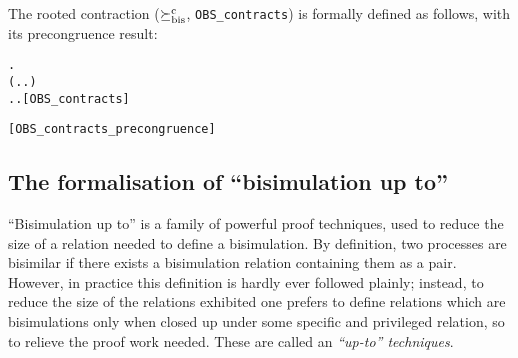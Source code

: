 The rooted contraction ($\mathrel{\succeq^{\rm{c}}_{\rm{bis}}}$, \texttt{OBS_contracts}) is formally
defined as follows, with its precongruence result:
\begin{alltt}
 \HOLSymConst{\HOLTokenObsContracts}  \HOLSymConst{\HOLTokenDefEquality{}}
  \HOLSymConst{\HOLTokenForall{}}.
      (\HOLSymConst{\HOLTokenForall{}}.  \HOLTokenTransBegin{}\HOLTokenTransEnd {} \HOLSymConst{\HOLTokenImp{}} \HOLSymConst{\HOLTokenExists{}}.  \HOLTokenTransBegin{}\HOLTokenTransEnd {} \HOLSymConst{\HOLTokenConj{}}  \HOLSymConst{\HOLTokenContracts{}} ) \HOLSymConst{\HOLTokenConj{}}
      \HOLSymConst{\HOLTokenForall{}}.  \HOLTokenTransBegin{}\HOLTokenTransEnd {} \HOLSymConst{\HOLTokenImp{}} \HOLSymConst{\HOLTokenExists{}}.  \HOLTokenWeakTransBegin{}\HOLTokenWeakTransEnd {} \HOLSymConst{\HOLTokenConj{}}  \HOLSymConst{\HOLTokenWeakEQ} \hfill{[OBS_contracts]}

\HOLTokenTurnstile{}  \hfill{[OBS_contracts_precongruence]}
\end{alltt}

\subsection{The formalisation of ``bisimulation up to''}

``Bisimulation up to'' is a family of  powerful proof techniques,
used to reduce the size of a relation needed to define a bisimulation.
By definition, two processes are bisimilar if there exists a
bisimulation relation containing them as a pair. However, in practice
this definition is hardly ever followed plainly; instead, to reduce
the size of the relations exhibited one prefers to define relations
which are bisimulations only when closed up under some specific and
privileged relation, so to relieve the proof work needed. These are  called
 an \emph{``up-to'' techniques}. 



